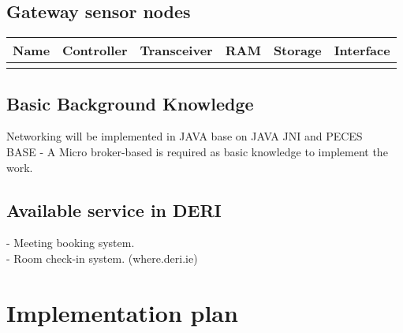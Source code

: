 \documentclass[a4paper]{llncs}
\newcommand{\head}[1]{\textnormal {\textbf{#1}}}
\begin{document}
\subsection{Gateway sensor nodes}

\begin{tabular}{|p{2.5cm}|c|p{2cm}|c|c|c|}
\hline
\head{Name} & \head{Controller} & \head{Transceiver} & \head{RAM} & \head{Storage} &\head{Interface}\\
\hline
{} &{}&{}&{}&{}&{}\\
\hline
\end{tabular}

\subsection{Basic Background Knowledge}
Networking will be implemented in JAVA base on JAVA JNI and PECES\\
BASE - A Micro broker-based is required as basic knowledge to implement the work.

\subsection{Available service in DERI}
- Meeting booking system.\\
- Room check-in system. (where.deri.ie)



\section{Implementation plan}



\end{document}
